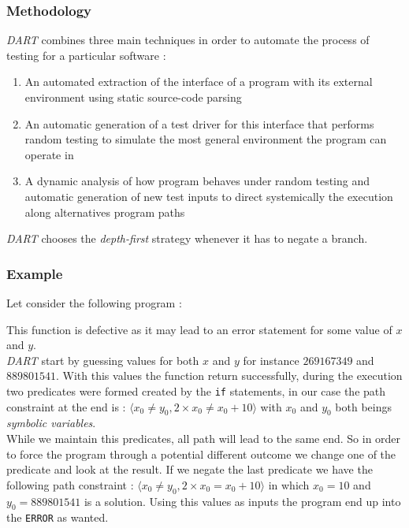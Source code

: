 \documentclass[11pt]{IEEEtran}
\begin{document}
    	\subsubsection{Methodology}
	    	\emph{DART} combines three main techniques 	    	\cite{godefroid2005dart} in order to automate the process of testing for a particular software :
	    	\begin{enumerate}
	    		\item An automated extraction of the interface of a program with its external environment using static source-code parsing
	    		\item An automatic generation of a test driver for this interface that performs random testing to simulate the most general environment the program can operate in
	    		\item A dynamic analysis of how program behaves under random testing and automatic generation of new test inputs to direct systemically the execution along alternatives program paths
	    	\end{enumerate}

			\emph{DART} chooses the \emph{depth-first} strategy whenever it has to negate a branch.

	    \subsubsection{Example}
		    Let consider the following program :

		    \begin{algorithm}


		    \end{algorithm}

	    	This function is defective as it may lead to an error statement for some value of $x$ and $y$.\\
	    	\emph{DART} start by guessing values for both $x$ and $y$ for instance $269167349$ and $889801541$. With this values the function return  successfully, during the execution two predicates were formed created by the \texttt{if} statements, in our case the path constraint at the end is : $\langle x_0 \neq y_0, 2 \times x_0 \neq x_0 + 10 \rangle$ with $x_0$ and $y_0$ both beings \emph{symbolic variables}.\\ %
	    	While we maintain this predicates, all path will lead to the same end. So in order to force  the program through a potential different outcome we change one of the predicate and look at the result. If we negate the last predicate we have the following path constraint : $\langle x_0 \neq y_0, 2 \times x_0 = x_0 + 10 \rangle$ in which $x_0=10$ and $y_0=889801541$ is a solution. Using this values as inputs the program end up into the \texttt{ERROR} as wanted.
\end{document}
